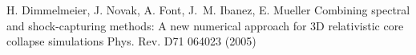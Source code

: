 









\begin{thebibliography}{9}

H. Dimmelmeier, J. Novak, A. Font, J.~M. Ibanez, E. Mueller 
\newblock 
Combining spectral and shock-capturing methods: A new numerical approach 
for 3D relativistic core collapse simulations
\newblock Phys. Rev. D71 064023 (2005)

\end{thebibliography}


